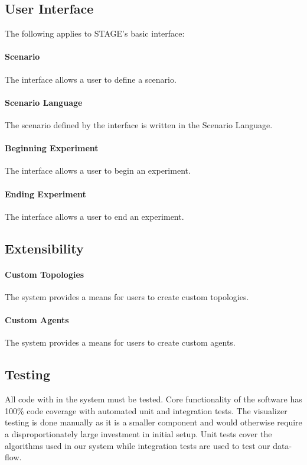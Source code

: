 \documentclass[titlepage]{article}
\begin{document}

\subsection{User Interface%
  \label{user-interface}%
}

The following applies to STAGE's basic interface:
    \paragraph{Scenario} The interface allows a user to define a scenario.
    \paragraph{Scenario Language} The scenario defined by the interface is written in the Scenario Language.
    \paragraph{Beginning Experiment} The interface allows a user to begin an experiment.
    \paragraph{Ending Experiment} The interface allows a user to end an experiment.


\subsection{Extensibility%
  \label{extensibility}%
}
    \paragraph{Custom Topologies} The system provides a means for users to create custom topologies.
    \paragraph{Custom Agents} The system provides a means for users to create custom agents.

\subsection{Testing%
    \label{testing}%
}
All code with in the system must be tested. Core functionality of the software has 100\% code coverage with automated unit and integration tests.  The visualizer testing is done manually as it is a smaller component and would otherwise require a disproportionately large investment in initial setup.  Unit tests cover the algorithms used in our system while integration tests are used to test our data-flow.  
\end{document}
